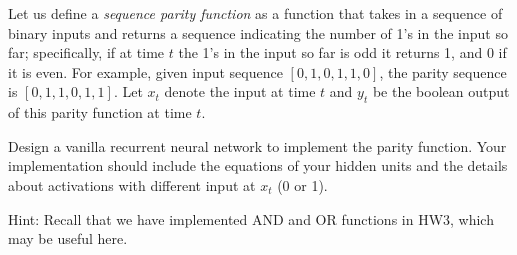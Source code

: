 Let us define a \emph{sequence parity function} as a function that takes in a sequence of binary inputs  
and returns a sequence indicating the number of 1's in the input so far; specifically, if at time $t$ 
the 1's in the input so far is odd it returns 1, and 0 if it is even. 
For example, given input sequence $[0, 1, 0, 1, 1, 0]$, 
the parity sequence is $[0, 1, 1, 0, 1, 1]$. 
Let $x_t$ denote the input at time $t$ and $y_t$ be the boolean output of this parity function at time $t$. 

Design a vanilla recurrent neural network to implement the parity function. 
Your implementation should include the equations of your hidden units and 
the details about activations with different input at $x_t$ (0 or 1). 

Hint: Recall that we have implemented AND and OR functions in HW3, which may be useful here. 